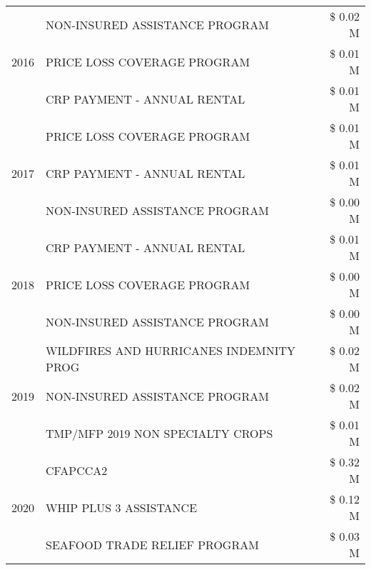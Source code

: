 \begin{tabular}{llr}
\cline{1-3}
\multirow[t]{3}{*}{2016} & NON-INSURED ASSISTANCE PROGRAM & \$ 0.02 M \\
 & PRICE LOSS COVERAGE PROGRAM & \$ 0.01 M \\
 & CRP PAYMENT - ANNUAL RENTAL & \$ 0.01 M \\
\cline{1-3}
\multirow[t]{3}{*}{2017} & PRICE LOSS COVERAGE PROGRAM & \$ 0.01 M \\
 & CRP PAYMENT - ANNUAL RENTAL & \$ 0.01 M \\
 & NON-INSURED ASSISTANCE PROGRAM & \$ 0.00 M \\
\cline{1-3}
\multirow[t]{3}{*}{2018} & CRP PAYMENT - ANNUAL RENTAL & \$ 0.01 M \\
 & PRICE LOSS COVERAGE PROGRAM & \$ 0.00 M \\
 & NON-INSURED ASSISTANCE PROGRAM & \$ 0.00 M \\
\cline{1-3}
\multirow[t]{3}{*}{2019} & WILDFIRES AND HURRICANES INDEMNITY PROG & \$ 0.02 M \\
 & NON-INSURED ASSISTANCE PROGRAM & \$ 0.02 M \\
 & TMP/MFP 2019 NON SPECIALTY CROPS & \$ 0.01 M \\
\cline{1-3}
\multirow[t]{3}{*}{2020} & CFAPCCA2 & \$ 0.32 M \\
 & WHIP PLUS 3 ASSISTANCE & \$ 0.12 M \\
 & SEAFOOD TRADE RELIEF PROGRAM & \$ 0.03 M \\
\cline{1-3}
\bottomrule
\end{tabular}
